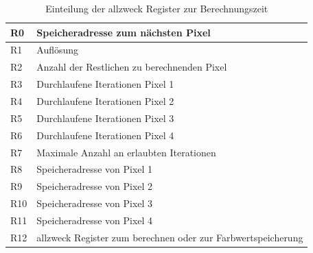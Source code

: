 \documentclass[11pt]{scrartcl}
\begin{document}
\begin{table}
  \begin{center}
    \begin{tabular}{| l | l |}
      \hline
      R0 & Speicheradresse zum nächsten Pixel \\ \hline
      R1 & Auflösung\\ \hline
      R2 & Anzahl der Restlichen zu berechnenden Pixel \\ \hline
      R3 & Durchlaufene Iterationen Pixel 1 \\ \hline
      R4 & Durchlaufene Iterationen Pixel 2 \\ \hline
      R5 & Durchlaufene Iterationen Pixel 3 \\ \hline
      R6 & Durchlaufene Iterationen Pixel 4 \\ \hline
      R7 & Maximale Anzahl an erlaubten Iterationen \\ \hline
      R8 & Speicheradresse von Pixel 1 \\ \hline
      R9 & Speicheradresse von Pixel 2 \\ \hline
      R10 & Speicheradresse von Pixel 3 \\ \hline
      R11 & Speicheradresse von Pixel 4 \\ \hline
      R12 & allzweck Register zum berechnen oder zur Farbwertspeicherung \\ \hline
    \end{tabular}
  \end{center}

  \caption{Einteilung der allzweck Register zur Berechnungszeit}
  \label{tbl: Allg}
\end{table}
\end{document}
